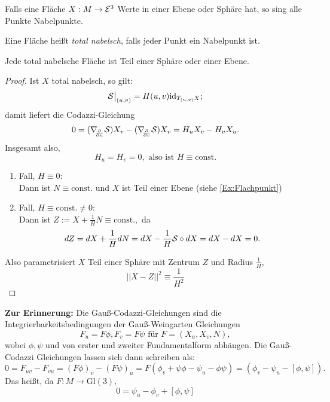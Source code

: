 \begin{example}
	
	Falls eine Fläche $ X: M \rightarrow \mathcal E^3 $ Werte in einer Ebene oder Sphäre hat, so sing alle Punkte Nabelpunkte.
	
\end{example}

\begin{definition}
	
	Eine Fläche heißt \emph{total nabelsch}, falls jeder Punkt ein Nabelpunkt ist.
	
\end{definition}

\begin{theorem}
	
	Jede total nabelsche Fläche ist Teil einer Sphäre oder einer Ebene.
	
\end{theorem}

\begin{proof}
	
	Ist $ X $ total nabelsch, so gilt:
		\[ \mathcal S\big|_{(u,v)} = H(u,v) \mathrm{id}_{T_{(u,v)}X}; \]
	damit liefert die Codazzi-Gleichung
		\[ 0 = (\nabla_{\!\!{\partial\over \partial u}}\mathcal S)X_v - (\nabla_{\!\!{\partial\over \partial v}}\mathcal S)X_v = H_uX_v - H_vX_u. \]
	Insgesamt also,
		\[H_u = H_v=0, \text{ also ist } H \equiv \mathrm{const.}  \]
	
	\begin{enumerate}
		
		\item Fall, $ H \equiv 0 $:\\
		Dann ist $ N \equiv \mathrm{const.} $ und $ X $ ist Teil einer Ebene (siehe \ref*{Ex:Flachpunkt})
		
		\item Fall, $ H \equiv \mathrm{const.} \neq 0 $: \\
		Dann ist $ Z := X + \frac{1}{H}N \equiv \mathrm{const.}, $ da
			\[ dZ = dX + \frac{1}{H}dN = dX - \frac{1}{H}\mathcal S \circ dX = dX - dX = 0. \]
		
	\end{enumerate}

	Also parametrisiert $ X $ Teil einer Sphäre mit Zentrum $ Z $ und Radius $ \frac{1}{H} $,
		\[ ||X-Z||^2 \equiv \frac{1}{H^2} \]
	
\end{proof}

\textbf{Zur Erinnerung:} Die Gauß-Codazzi-Gleichungen sind die Integrierbarkeitsbedingungen der Gauß-Weingarten Gleichungen
	\begin{equation}\label{Eq:GausWeingarten}
		F_u = F \phi, F_v = F \psi \text{ für } F = (X_u,X_v,N),
	\end{equation}
	wobei $ \phi,\psi $ und von erster und zweiter Fundamentalform abhängen. Die Gauß-Codazzi Gleichungen lassen sich dann schreiben als:
	\[ 0 = F_{uv}-F_{vu} = (F\phi)_v - (F\psi)_u = F(\phi_v + \psi\phi -\psi_u - \phi\psi ) = (\phi_v - \psi_u -[ \phi,\psi ]). \]
Das heißt, da $ F:M\rightarrow \mathrm{Gl}(3), $
	\begin{equation}\label{Eq:GausWeingarten2}
		0 = \psi_u - \phi_v + [\phi,\psi]
	\end{equation}
%	

